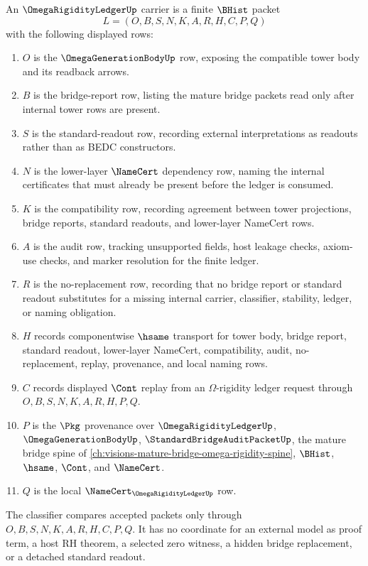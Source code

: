 \begin{definition}
\label{def:omega-rigidity-ledger-carrier}
An $\OmegaRigidityLedgerUp$ carrier is a finite $\BHist$ packet
$$
L=(O,B,S,N,K,A,R,H,C,P,Q)
$$
with the following displayed rows:
\begin{enumerate}
\item $O$ is the $\OmegaGenerationBodyUp$ row, exposing the compatible tower body and its readback arrows.
\item $B$ is the bridge-report row, listing the mature bridge packets read only after internal tower rows are present.
\item $S$ is the standard-readout row, recording external interpretations as readouts rather than as BEDC constructors.
\item $N$ is the lower-layer $\NameCert$ dependency row, naming the internal certificates that must already be present before the ledger is consumed.
\item $K$ is the compatibility row, recording agreement between tower projections, bridge reports, standard readouts, and lower-layer NameCert rows.
\item $A$ is the audit row, tracking unsupported fields, host leakage checks, axiom-use checks, and marker resolution for the finite ledger.
\item $R$ is the no-replacement row, recording that no bridge report or standard readout substitutes for a missing internal carrier, classifier, stability, ledger, or naming obligation.
\item $H$ records componentwise $\hsame$ transport for tower body, bridge report, standard readout, lower-layer NameCert, compatibility, audit, no-replacement, replay, provenance, and local naming rows.
\item $C$ records displayed $\Cont$ replay from an $\Omega$-rigidity ledger request through $O,B,S,N,K,A,R,H,P,Q$.
\item $P$ is the $\Pkg$ provenance over $\OmegaRigidityLedgerUp$, $\OmegaGenerationBodyUp$, $\StandardBridgeAuditPacketUp$, the mature bridge spine of \autoref{ch:visions-mature-bridge-omega-rigidity-spine}, $\BHist$, $\hsame$, $\Cont$, and $\NameCert$.
\item $Q$ is the local $\NameCert_{\OmegaRigidityLedgerUp}$ row.
\end{enumerate}
The classifier compares accepted packets only through $O,B,S,N,K,A,R,H,C,P,Q$. It has no coordinate for an external model as proof term, a host RH theorem, a selected zero witness, a hidden bridge replacement, or a detached standard readout.
\end{definition}


